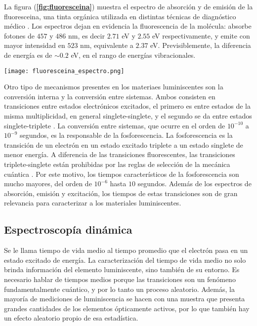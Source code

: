 \noindent La figura (\textbf{\ref{fig:fluoresceina}}) muestra el espectro de absorción y de emisión de la fluoresceina, una tinta orgánica utilizada en distintas técnicas de diagnóstico médico \cite{fluoresceina_1,fluoresceina_2}.
Los espectros dejan en evidencia la fluorescencia de la molécula: absorbe fotones de $457$ y $486$ nm, es decir $2.71$ eV y $2.55$ eV respectivamente, y emite con mayor intensidad en $523$ nm, equivalente a $2.37$ eV.
Previsiblemente, la diferencia de energía es de $\sim 0.2$ eV, en el rango de energías vibracionales.


\begin{SCfigure}
    \centering
    \texttt{[image: fluoresceina\_espectro.png]}
    \caption{\textbf{Espectro de la Fluoresceina} diluida en etanol, tanto de absorción (azul) como de emisión (rojo). El cuadro muestra los picos de absorción en $\lambda_{abs}=457$ nm y 486 nm, y de emisión en $\lambda_{em}$ = 523 nm. Tomada y adaptada de \cite{kristoffersen_testing_2018}.}
    \label{fig:fluoresceina}
\end{SCfigure}

Otro tipo de mecanismos presentes en los materiaes luminiscentes son la conversión interna y la conversión entre sistemas.
Ambos consisten en transiciones entre estados electrónicos excitados, el primero es entre estados de la misma multiplicidad, en general singlete-singlete, y el segundo se da entre estados singlete-triplete \cite{valeur_characteristics_2012}.
La conversión entre sistemas, que ocurre en el orden de $10^{-10}$ a $10^{-9}$ segundos, es la responsable de la fosforescencia.
La fosforescencia es la transición de un electrón en un estado excitado triplete a un estado singlete de menor energía.
A diferencia de las transiciones fluorescentes, las transiciones triplete-singlete están prohibidas por las reglas de selección de la mecánica cuántica \cite{demtroder_emission_2010}.
Por este motivo, los tiempos característicos de la fosforescencia son mucho mayores, del orden de $10^{-6}$ hasta $10$ segundos.
Además de los espectros de absorción, emisión y excitación, los tiempos de estas transiciones son de gran relevancia para caracterizar a los materiales luminiscentes.

\subsection{Espectroscopía dinámica} \label{sec:dinamica}



Se le llama tiempo de vida medio al tiempo promedio que el electrón pasa en un estado excitado de energía.
La caracterización del tiempo de vida medio no solo brinda información del elemento luminiscente, sino también de su entorno.
Es necesario hablar de tiempos medios porque las transiciones son un fenómeno fundamentalmente cuántico, y por lo tanto un proceso aleatorio.
Además, la mayoría de mediciones de luminiscencia se hacen con una muestra que presenta grandes cantidades de los elementos ópticamente activos, por lo que también hay un efecto aleatorio propio de esa estadística.

